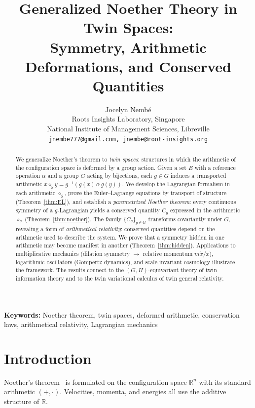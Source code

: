 \documentclass[11pt,twocolumn]{article}
\title{\textbf{Generalized Noether Theory in Twin Spaces:\\Symmetry, Arithmetic Deformations, and Conserved Quantities}}
\author{Jocelyn Nemb\'e\\
\small Roots Insights Laboratory, Singapore\\
\small National Institute of Management Sciences, Libreville\\
\small \texttt{jnembe777@gmail.com, jnembe@root-insights.org}}
\date{}
\theoremstyle{plain}
\theoremstyle{definition}
\theoremstyle{remark}
\newcommand{\R}{\mathbb{R}}
\begin{document}
\maketitle

\begin{abstract}
We generalize Noether's theorem to \emph{twin spaces}: structures in which the arithmetic of the configuration space is deformed by a group action. Given a set $E$ with a reference operation $\alpha$ and a group $G$ acting by bijections, each $g \in G$ induces a transported arithmetic $x \diamond_g y = g^{-1}(g(x) \,\alpha\, g(y))$. We develop the Lagrangian formalism in each arithmetic $\diamond_g$, prove the Euler--Lagrange equations by transport of structure (Theorem~\ref{thm:EL}), and establish a \emph{parametrized Noether theorem}: every continuous symmetry of a $g$-Lagrangian yields a conserved quantity $C_g$ expressed in the arithmetic $\diamond_g$ (Theorem~\ref{thm:noether}). The family $\{C_g\}_{g \in G}$ transforms covariantly under $G$, revealing a form of \emph{arithmetical relativity}: conserved quantities depend on the arithmetic used to describe the system. We prove that a symmetry hidden in one arithmetic may become manifest in another (Theorem~\ref{thm:hidden}). Applications to multiplicative mechanics (dilation symmetry $\to$ relative momentum $m\dot{x}/x$), logarithmic oscillators (Gompertz dynamics), and scale-invariant cosmology illustrate the framework. The results connect to the $(G,H)$-equivariant theory of twin information theory and to the twin variational calculus of twin general relativity.
\end{abstract}

\noindent\textbf{Keywords:} Noether theorem, twin spaces, deformed arithmetic, conservation laws, arithmetical relativity, Lagrangian mechanics


\section{Introduction}
\label{sec:intro}

Noether's theorem~\cite{noether1918} is formulated on the configuration space $\R^n$ with its standard arithmetic $(+, \cdot)$. Velocities, momenta, and energies all use the additive structure of $\R$.
\end{document}
